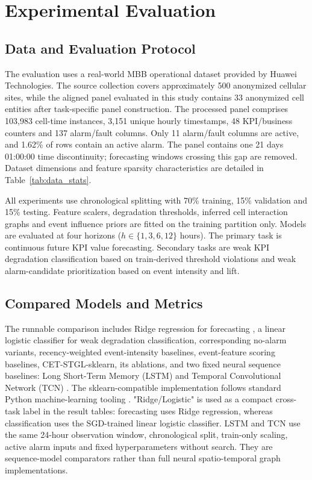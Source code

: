 \section{Experimental Evaluation}
\label{sec:experimental_evaluation}
\label{sec:experiments}

\subsection{Data and Evaluation Protocol}
\label{sec:data_protocol}

The evaluation uses a real-world MBB operational dataset provided by Huawei Technologies. The source collection covers approximately 500 anonymized cellular sites, while the aligned panel evaluated in this study contains 33 anonymized cell entities after task-specific panel construction. The processed panel comprises 103,983 cell-time instances, 3,151 unique hourly timestamps, 48 KPI/business counters and 137 alarm/fault columns. Only 11 alarm/fault columns are active, and 1.62\% of rows contain an active alarm. The panel contains one 21 days 01:00:00 time discontinuity; forecasting windows crossing this gap are removed. Dataset dimensions and feature sparsity characteristics are detailed in Table~\ref{tab:data_stats}.

All experiments use chronological splitting with 70\% training, 15\% validation and 15\% testing. Feature scalers, degradation thresholds, inferred cell interaction graphs and event influence priors are fitted on the training partition only. Models are evaluated at four horizons ($h \in \{1, 3, 6, 12\}$ hours). The primary task is continuous future KPI value forecasting. Secondary tasks are weak KPI degradation classification based on train-derived threshold violations and weak alarm-candidate prioritization based on event intensity and lift.



\subsection{Compared Models and Metrics}
\label{sec:models_metrics}

The runnable comparison includes Ridge regression for forecasting \cite{hoerl1970ridge}, a linear logistic classifier for weak degradation classification, corresponding no-alarm variants, recency-weighted event-intensity baselines, event-feature scoring baselines, CET-STGL-sklearn, its ablations, and two fixed neural sequence baselines: Long Short-Term Memory (LSTM) \cite{hochreiter1997lstm} and Temporal Convolutional Network (TCN) \cite{bai2018tcn}. The sklearn-compatible implementation follows standard Python machine-learning tooling \cite{pedregosa2011sklearn}. "Ridge/Logistic" is used as a compact cross-task label in the result tables: forecasting uses Ridge regression, whereas classification uses the SGD-trained linear logistic classifier. LSTM and TCN use the same 24-hour observation window, chronological split, train-only scaling, active alarm inputs and fixed hyperparameters without search. They are sequence-model comparators rather than full neural spatio-temporal graph implementations.

